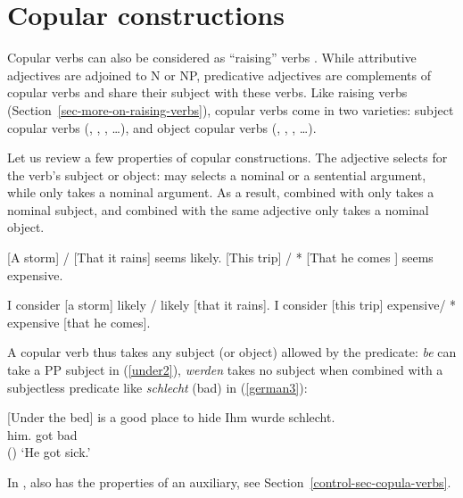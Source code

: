 \documentclass[output=paper
	        ,collection
	        ,collectionchapter
 	        ,biblatex
                ,babelshorthands
                ,newtxmath
                ,draftmode
                ,colorlinks, citecolor=brown
]{langscibook}
\begin{document}
\section{Copular constructions}
\label{sec-copular-constructions}

Copular verbs can also be considered as ``raising'' verbs \citep[]{Chomsky81a}. 
While attributive adjectives are adjoined to N or NP, predicative adjectives are complements of copular verbs and share their subject with these verbs. Like raising verbs (Section~\ref{sec-more-on-raising-verbs}), copular verbs come in two varieties: subject copular verbs (, , , \ldots), and object copular verbs (, , , \ldots).

Let us review a few properties of copular constructions.
The adjective selects for the verb's subject or object:  may selects a nominal or a sentential argument, while  only takes a nominal argument. As a result,  combined with  only takes a nominal subject, and  combined with the same adjective only takes a nominal object.


\begin{exe}
\ex \label{storm}
\begin{xlist}
\ex{} [A storm] / [That it rains] seems likely.
\ex{} [This trip] / * [That he comes ] seems expensive.
\end{xlist}
\ex \begin{xlist}
\ex 	I consider [a storm] likely / likely [that it rains].
\ex 	I consider [this trip] expensive/ * expensive [that he comes].
\end{xlist}	
\end{exe}


A copular verb thus takes any subject (or object) allowed by the predicate: \emph{be} can take a PP subject in  (\ref{under2}), \emph{werden} takes no subject when combined with a subjectless predicate like \emph{schlecht} (bad) in  (\ref{german3}):

\eal
\ex{}[Under the bed] is a good place to hide \label{under2}
\ex
\label{german3} 
\gll Ihm        wurde schlecht.\footnotemark\\
     him.\DAT{} got   bad\\\hfill()
\glt `He got sick.'
\zl

 In ,  also has the properties of an auxiliary, see Section~\ref{control-sec-copula-verbs}.
\end{document}
